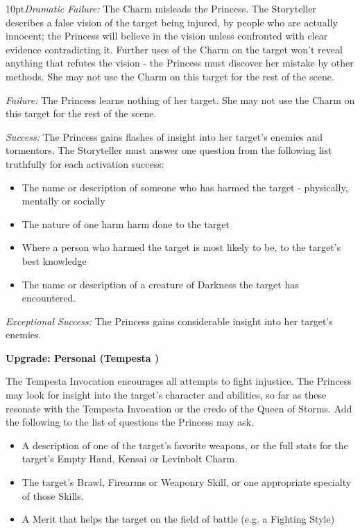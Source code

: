 \begin{myindentpar}{10pt}\emph{Dramatic Failure:} The Charm misleads the Princess. The Storyteller describes a false vision of the target being injured, by people who are actually innocent; the Princess will believe in the vision unless confronted with clear evidence contradicting it. Further uses of the Charm on the target won't reveal anything that refutes the vision - the Princess must discover her mistake by other methods. She may not use the Charm on this target for the rest of the scene.

\emph{Failure:} The Princess learns nothing of her target. She may not use the Charm on this target for the rest of the scene.

\emph{Success:} The Princess gains flashes of insight into her target's enemies and tormentors. The Storyteller must answer one question from the following list truthfully for each activation success:

\begin{itemize}
\item The name or description of someone who has harmed the target - physically, mentally or socially
\item The nature of one harm harm done to the target
\item Where a person who harmed the target is most likely to be, to the target's best knowledge
\item The name or description of a creature of Darkness the target has encountered.
\end{itemize}

\emph{Exceptional Success:} The Princess gains considerable insight into her target's enemies.

\textbf{Upgrade: Personal (Tempesta \textbullet\textbullet)}

The Tempesta Invocation encourages all attempts to fight injustice. The Princess may look for insight into the target's character and abilities, so far as these resonate with the Tempesta Invocation or the credo of the Queen of Storms. Add the following to the list of questions the Princess may ask.
\begin{itemize}
\item A description of one of the target's favorite weapons, or the full stats for the target's Empty Hand, Kensai or Levinbolt Charm. 
\item The target's Brawl, Firearms or Weaponry Skill, or one appropriate specialty of those Skills. 
\item A Merit that helps the target on the field of battle (e.g. a Fighting Style)\end{itemize}
\end{myindentpar}
                                         

